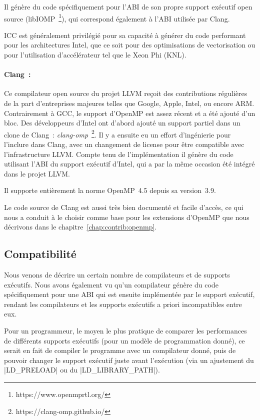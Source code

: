 Il génère du code spécifiquement pour l'ABI de son propre support exécutif open source (libIOMP~\footnote{https://www.openmprtl.org/}), qui correspond également à l'ABI utilisée par Clang.

ICC est généralement privilégié pour sa capacité à générer du code performant pour les architectures Intel, que ce soit pour des optimisations de vectorisation ou pour l'utilisation d'accélérateur tel que le Xeon Phi (KNL).



\paragraph{Clang~:}
Ce compilateur open source du projet LLVM reçoit des contributions régulières de la part d'entreprises majeures telles que Google, Apple, Intel, ou encore ARM.
Contrairement à GCC, le support d'OpenMP est assez récent et a été ajouté d'un bloc.
Des développeurs d'Intel ont d'abord ajouté un support partiel dans un clone de Clang~: \emph{clang-omp}~\footnote{https://clang-omp.github.io/}.
Il y a ensuite eu un effort d'ingénierie pour l'inclure dans Clang, avec un changement de license pour être compatible avec l'infrastructure LLVM.
Compte tenu de l'implémentation il génère du code utilisant l'ABI du support exécutif d'Intel, qui a par la même occasion été intégré dans le projet LLVM.

Il supporte entièrement la norme OpenMP~4.5 depuis sa version~3.9.

Le code source de Clang est aussi très bien documenté et facile d'accès, ce qui nous a conduit à le choisir comme base pour les extensions d'OpenMP que nous décrivons dans le chapitre~\ref{chap:contrib:openmp}.

\subsection{Compatibilité}\label{sec:rw:compilers:compat}

Nous venons de décrire un certain nombre de compilateurs et de supports exécutifs.
Nous avons également vu qu'un compilateur génère du code spécifiquement pour une ABI qui est ensuite implémentée par le support exécutif, rendant les compilateurs et les supports exécutifs a priori incompatibles entre eux.

Pour un programmeur, le moyen le plus pratique de comparer les performances de différents supports exécutifs (pour un modèle de programmation donné), ce serait en fait de compiler le programme avec un compilateur donné, puis de pouvoir changer le support exécutif juste avant l'exécution (via un ajustement du |LD_PRELOAD| ou du |LD_LIBRARY_PATH|).

